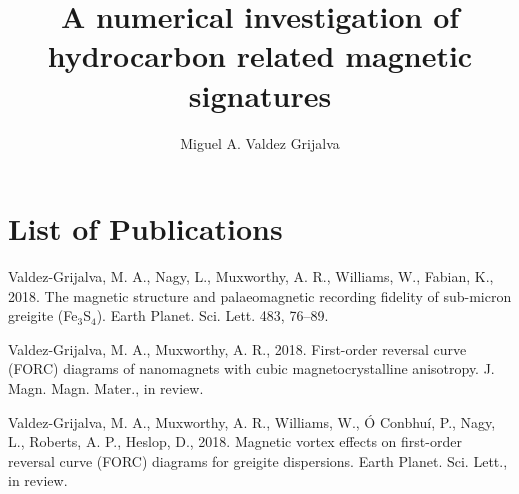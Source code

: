 \documentclass[a4paper,12pt,twoside]{report}
\title{\LARGE {A numerical investigation of hydrocarbon related magnetic signatures}\\
\vspace*{6mm}
}
\author{Miguel A. Valdez Grijalva}
\begin{document}
\pagestyle{fancy}
\maketitle

\setcounter{page}{2}







\pagestyle{plain}

{}
{}
\tableofcontents
\newpage

{}
\listoffigures

\newpage
{}
{}
\chapter*{List of Publications}
Valdez-Grijalva, M. A., Nagy, L., Muxworthy, A. R., Williams, W., Fabian, K., 2018. The magnetic structure and palaeomagnetic recording fidelity of sub-micron greigite (Fe$_3$S$_4$). Earth Planet. Sci. Lett. 483, 76--89.\par
\bigskip
\noindent Valdez-Grijalva, M. A., Muxworthy, A. R., 2018. First-order reversal curve (FORC) diagrams of nanomagnets with cubic magnetocrystalline anisotropy. J. Magn. Magn. Mater., in review.\par
\bigskip
\noindent Valdez-Grijalva, M. A., Muxworthy, A. R., Williams, W., \'O Conbhu\'i, P., Nagy, L., Roberts, A. P., Heslop, D., 2018. Magnetic vortex effects on first-order reversal curve (FORC) diagrams for greigite dispersions. Earth Planet. Sci. Lett., in review.\par

\printnomenclature

\fancyhead[L]{\leftmark}
\fancyhead[C]{}
\fancyhead[R]{}
\fancyfoot[C]{\thepage}
\thispagestyle{empty}
\pagestyle{fancy}

\doublespacing
\clearpage


%
%
%
%
%
%







\end{document}
